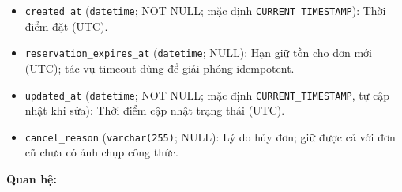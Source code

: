 \begin{itemize}
\item \texttt{created\_at} (\texttt{datetime}; NOT NULL; mặc định \texttt{CURRENT\_TIMESTAMP}): Thời điểm đặt (UTC).

\item \texttt{reservation\_expires\_at} (\texttt{datetime}; NULL): Hạn giữ tồn cho đơn mới (UTC); tác vụ timeout dùng để giải phóng idempotent.

\item \texttt{updated\_at} (\texttt{datetime}; NOT NULL; mặc định \texttt{CURRENT\_TIMESTAMP}, tự cập nhật khi sửa): Thời điểm cập nhật trạng thái (UTC).

\item \texttt{cancel\_reason} (\texttt{varchar(255)}; NULL): Lý do hủy đơn; giữ được cả với đơn cũ chưa có ảnh chụp công thức.

\end{itemize}

\textbf{Quan hệ:}

